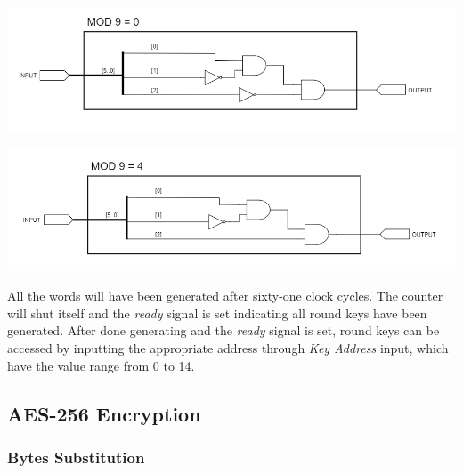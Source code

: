 \documentclass[a4paper, 10pt]{article}
\newenvironment{Figure}
    {\par\medskip\noindent\minipage{\linewidth}}
    {\endminipage\par\medskip}
\begin{document}
\begin{multicols}{2}
            \noindent
            \begin{Figure}
                \centering
                \includegraphics[width=\linewidth]{Mod9Eq0.png}
                \label{fig:mod9eq0}
            \end{Figure}

            \noindent
            \begin{Figure}
                \centering
                \includegraphics[width=\linewidth]{Mod9Eq4.png}
                \label{fig:mod9eq4}
            \end{Figure}

            All the words will have been generated after sixty-one clock cycles. The counter will shut itself and the \textit{ready} signal is set indicating all round keys have been generated. After done generating and the \textit{ready} signal is set, round keys can be accessed by inputting the appropriate address through \textit{Key Address} input, which have the value range from 0 to 14.
            
            \subsection{AES-256 Encryption}

            \subsubsection{Bytes Substitution}


\end{multicols}
\end{document}
